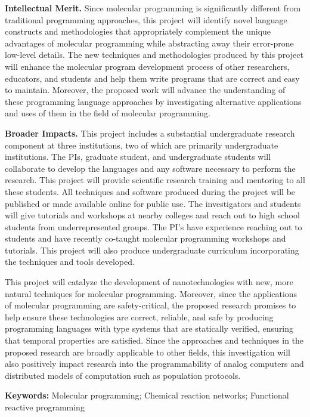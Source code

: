 \documentclass[11pt]{article}
\begin{document}
    \textbf{Intellectual Merit.}
    Since molecular programming is significantly different from traditional programming approaches, this project will identify novel language constructs and methodologies that appropriately complement the unique advantages of molecular programming while abstracting away their error-prone low-level details.
    The new techniques and methodologies produced by this project will enhance the molecular program development process of other researchers, educators, and students and help them write programs that are correct and easy to maintain.
    Moreover, the proposed work will advance the understanding of these programming language approaches by investigating alternative applications and uses of them in the field of molecular programming.

    \textbf{Broader Impacts.}
    This project includes a substantial undergraduate research component at three institutions, two of which are primarily undergraduate institutions.
    The PIs, graduate student, and undergraduate students will collaborate to develop the languages and any software necessary to perform the research.
    This project will provide scientific research training and mentoring to all these students.
    All techniques and software produced during the project will be published or made available online for public use.
    The investigators and students will give tutorials and workshops at nearby colleges and reach out to high school students from underrepresented groups.
    The PI's have experience reaching out to students and have recently co-taught molecular programming workshops and tutorials.
    This project will also produce undergraduate curriculum incorporating the techniques and tools developed.

    This project will catalyze the development of nanotechnologies with new, more natural techniques for molecular programming.
    Moreover, since the applications of molecular programming are safety-critical, the proposed research promises to help ensure these technologies are correct, reliable, and safe by producing programming languages with type systems that are statically verified, ensuring that temporal properties are satisfied.
    Since the approaches and techniques in the proposed research are broadly applicable to other fields, this investigation will also positively impact research into the programmability of analog computers and distributed models of computation such as population protocols.

    \vspace*{1ex}
    \noindent
    \textbf{Keywords:}
    Molecular programming;
    Chemical reaction networks;
    Functional reactive programming
\end{document}
